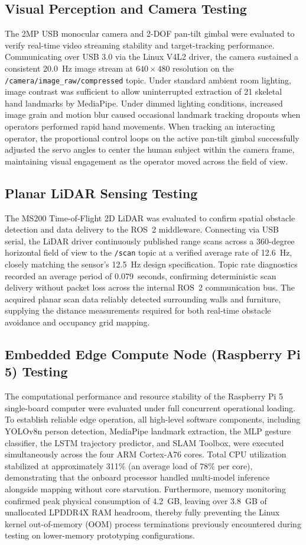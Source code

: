 \subsection{Visual Perception and Camera Testing}
The 2MP USB monocular camera and 2-DOF pan-tilt gimbal were evaluated to verify real-time video streaming stability and target-tracking performance. Communicating over USB 3.0 via the Linux V4L2 driver, the camera sustained a consistent 20.0~Hz image stream at $640 \times 480$ resolution on the \texttt{/camera/image\_raw/compressed} topic. Under standard ambient room lighting, image contrast was sufficient to allow uninterrupted extraction of 21 skeletal hand landmarks by MediaPipe. Under dimmed lighting conditions, increased image grain and motion blur caused occasional landmark tracking dropouts when operators performed rapid hand movements. When tracking an interacting operator, the proportional control loops on the active pan-tilt gimbal successfully adjusted the servo angles to center the human subject within the camera frame, maintaining visual engagement as the operator moved across the field of view.

\subsection{Planar LiDAR Sensing Testing}
The MS200 Time-of-Flight 2D LiDAR was evaluated to confirm spatial obstacle detection and data delivery to the ROS~2 middleware. Connecting via USB serial, the LiDAR driver continuously published range scans across a 360-degree horizontal field of view to the \texttt{/scan} topic at a verified average rate of 12.6~Hz, closely matching the sensor's 12.5~Hz design specification. Topic rate diagnostics recorded an average period of 0.079~seconds, confirming deterministic scan delivery without packet loss across the internal ROS~2 communication bus. The acquired planar scan data reliably detected surrounding walls and furniture, supplying the distance measurements required for both real-time obstacle avoidance and occupancy grid mapping.

\subsection{Embedded Edge Compute Node (Raspberry Pi 5) Testing}
The computational performance and resource stability of the Raspberry Pi 5 single-board computer were evaluated under full concurrent operational loading. To establish reliable edge operation, all high-level software components, including YOLOv8n person detection, MediaPipe landmark extraction, the MLP gesture classifier, the LSTM trajectory predictor, and SLAM Toolbox, were executed simultaneously across the four ARM Cortex-A76 cores. Total CPU utilization stabilized at approximately 311\% (an average load of 78\% per core), demonstrating that the onboard processor handled multi-model inference alongside mapping without core starvation. Furthermore, memory monitoring confirmed peak physical consumption of 4.2~GB, leaving over 3.8~GB of unallocated LPDDR4X RAM headroom, thereby fully preventing the Linux kernel out-of-memory (OOM) process terminations previously encountered during testing on lower-memory prototyping configurations.

